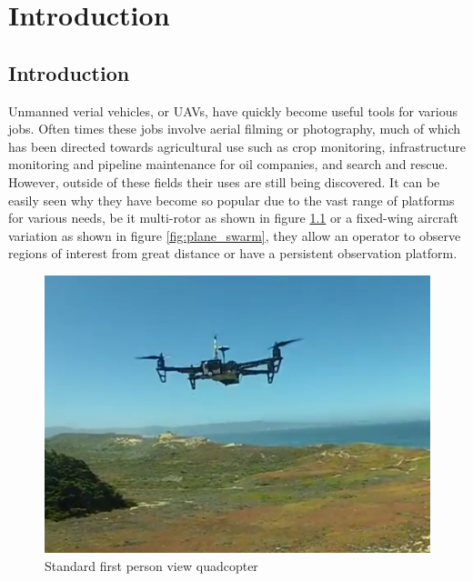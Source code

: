 \documentclass[12pt]{report}
\begin{document}
\tableofcontents

\chapter{Introduction}
\section{Introduction}
Unmanned verial vehicles, or UAVs, have quickly become useful tools for various jobs. Often times these jobs involve aerial filming or photography, much of which has been directed towards agricultural use such as crop monitoring, infrastructure monitoring and pipeline maintenance for oil companies, and search and rescue. However, outside of these fields their uses are still being discovered. It can be easily seen why they have become so popular due to the vast range of platforms for various needs, be it multi-rotor as shown in figure \ref{fig:quadcopter} or a fixed-wing aircraft variation as shown in figure \ref{fig:plane_swarm}, they allow an operator to observe regions of interest from great distance or have a persistent observation platform.
\begin{figure}[!ht]
	\centering
	\begin{minipage}{0.45\textwidth}
		\centering
		\includegraphics[scale=0.17]{kevin_flight.png}
		\caption{Standard first person view quadcopter \cite{Vogt}}
		\label{fig:quadcopter}
	\end{minipage}
\end{figure}
\end{document}
